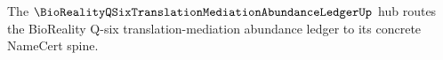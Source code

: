 The $\BioRealityQSixTranslationMediationAbundanceLedgerUp$ hub routes the BioReality Q-six translation-mediation abundance ledger to its concrete NameCert spine.

